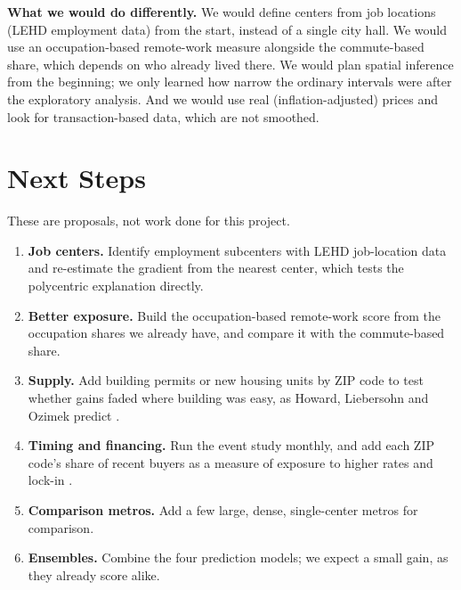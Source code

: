 \documentclass[11pt]{article}
\begin{document}
\textbf{What we would do differently.} We would define centers from job locations (LEHD employment data) from the start, instead of a single
city hall. We would use an occupation-based remote-work measure \cite{dingel} alongside the commute-based share, which depends on who already
lived there. We would plan spatial inference from the beginning; we only learned how narrow the ordinary intervals were after the exploratory
analysis. And we would use real (inflation-adjusted) prices and look for transaction-based data, which are not smoothed.

\section{Next Steps}

These are proposals, not work done for this project.
\begin{enumerate}\setlength{\itemsep}{0pt}
\item \textbf{Job centers.} Identify employment subcenters with LEHD job-location data and re-estimate the gradient from the nearest center,
which tests the polycentric explanation directly.
\item \textbf{Better exposure.} Build the occupation-based remote-work score \cite{dingel} from the occupation shares we already have, and
compare it with the commute-based share.
\item \textbf{Supply.} Add building permits or new housing units by ZIP code to test whether gains faded where building was easy, as Howard,
Liebersohn and Ozimek predict \cite{howard}.
\item \textbf{Timing and financing.} Run the event study monthly, and add each ZIP code's share of recent buyers as a measure of exposure to
higher rates and lock-in \cite{fonseca}.
\item \textbf{Comparison metros.} Add a few large, dense, single-center metros for comparison.
\item \textbf{Ensembles.} Combine the four prediction models; we expect a small gain, as they already score alike.
\end{enumerate}
\end{document}
